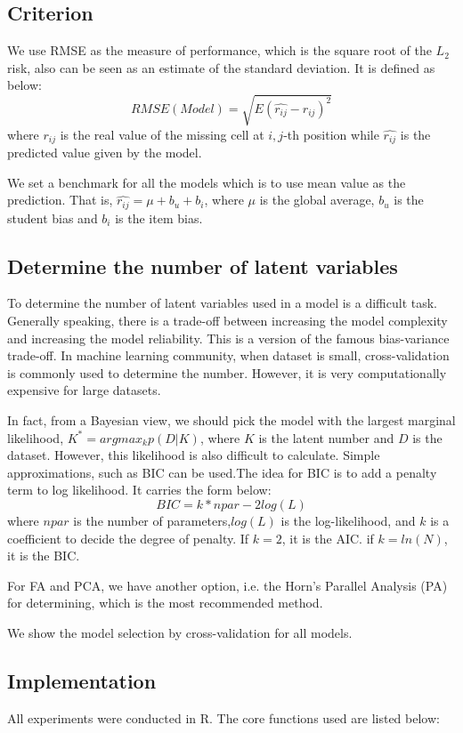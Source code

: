 \documentclass[11pt]{article}
\begin{document}
\subsection{Criterion}
We use RMSE as the measure of performance, which is the square root of the $L_2$ risk, also can be seen as an estimate of the standard deviation. It is defined as below:
$$RMSE(Model)=\sqrt{E(\hat{r_{ij}}-r_{ij})^2}$$
where $r_{ij}$ is the real value of the missing cell at $i,j$-th position while $\hat{r_{ij}}$ is the predicted value given by the model.

We set a benchmark for all the models which is to use mean value as the prediction. That is, $\hat{r_{ij}}=\mu+b_u+b_i$, where $\mu$ is the global average, $b_u$ is the student bias and $b_i$ is the item bias.

\subsection{Determine the number of latent variables}
To determine the number of latent variables used in a model is a difficult task. Generally speaking, there is a trade-off between increasing the model complexity and increasing the model reliability\cite{dibello200631a}. This is a version of the famous bias-variance trade-off\cite{friedman2001elements}. In machine learning community, when dataset is small, cross-validation is commonly used to determine the number. However, it is very computationally expensive for large datasets. 

In fact, from a Bayesian view, we should pick the model with the largest marginal likelihood, $K^{*}=argmax_kp(D|K)$, where $K$ is the latent number and $D$ is the dataset\cite{murphy2012machine}. However, this likelihood is also difficult to calculate. Simple approximations, such as BIC can be used\cite{fraley2002model}.The idea for BIC is to add a penalty term to log likelihood. It carries the form below: 
$$ BIC = k*npar - 2log(L) $$
where $npar$ is the number of parameters,$log(L)$ is the log-likelihood, and $k$ is a coefficient to decide the degree of penalty. If $k=2$, it is the AIC. if $k=ln(N)$, it is the BIC. 

For FA and PCA, we have another option, i.e. the Horn's Parallel Analysis (PA) \cite{horn1965rationale}for determining, which is the most recommended method\cite{hayton2004factor}. 

We show the model selection by cross-validation for all models. %
\subsection{Implementation}
All experiments were conducted in R. The core functions used are listed below:
 
\end{document}
